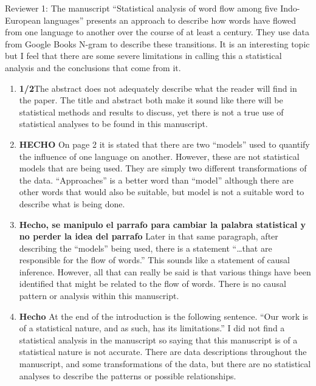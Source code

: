 \documentclass{article}
\begin{document}
	
	
	Reviewer 1: The manuscript “Statistical analysis of word flow among
five Indo-European languages” presents an approach to describe how
words have flowed from one language to another over the course of at
least a century. They use data from Google Books N-gram to describe
these transitions. It is an interesting topic but I feel that there
are some severe limitations in calling this a statistical analysis and
the conclusions that come from it.

	\begin{enumerate}
		
		\item \textbf{1/2}The abstract does not adequately describe what the reader will find
		in the paper. The title and abstract both make it sound like there
		will be statistical methods and results to discuss, yet there is not a
		true use of statistical analyses to be found in this manuscript.
		
		\item \textbf{HECHO} On page 2 it is stated that there are two “models” used to quantify
		the influence of one language on another. However, these are not
		statistical models that are being used. They are simply two different
		transformations of the data. “Approaches” is a better word than
		“model” although there are other words that would also be suitable,
		but model is not a suitable word to describe what is being done.
		
		
		\item \textbf{Hecho, se manipulo el parrafo para cambiar la palabra statistical y no perder la idea del parrafo} Later in that same paragraph, after describing the “models” being
		used, there is a statement “…that are responsible for the flow of
		words.” This sounds like a statement of causal inference. However, all
		that can really be said is that various things have been identified
		that might be related to the flow of words. There is no causal pattern
		or analysis within this manuscript.
		
		\item  \textbf{Hecho} At the end of the introduction is the following sentence. “Our work
		is of a statistical nature, and as such, has its limitations.” I did
		not find a statistical analysis in the manuscript so saying that this
		manuscript is of a statistical nature is not accurate. There are data
		descriptions throughout the manuscript, and some transformations of
		the data, but there are no statistical analyses to describe the
		patterns or possible relationships.
		

\end{enumerate}
\end{document}
